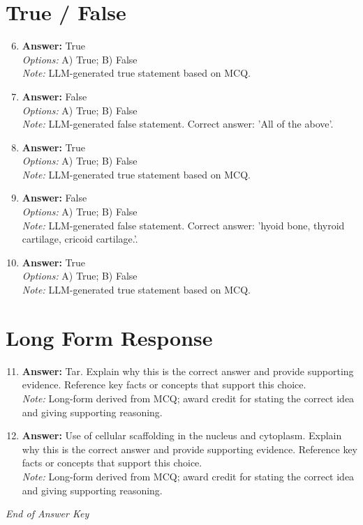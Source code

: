 \documentclass[12pt]{article}
\begin{document}
\section*{True / False}
\begin{enumerate}[label=\arabic*.]
\setcounter{enumi}{5}
\item \textbf{Answer:} True
\\ \textit{Options:} A) True; B) False
\\ \textit{Note:} LLM-generated true statement based on MCQ.
\item \textbf{Answer:} False
\\ \textit{Options:} A) True; B) False
\\ \textit{Note:} LLM-generated false statement. Correct answer: 'All of the above'.
\item \textbf{Answer:} True
\\ \textit{Options:} A) True; B) False
\\ \textit{Note:} LLM-generated true statement based on MCQ.
\item \textbf{Answer:} False
\\ \textit{Options:} A) True; B) False
\\ \textit{Note:} LLM-generated false statement. Correct answer: 'hyoid bone, thyroid cartilage, cricoid cartilage.'.
\item \textbf{Answer:} True
\\ \textit{Options:} A) True; B) False
\\ \textit{Note:} LLM-generated true statement based on MCQ.
\end{enumerate}

\section*{Long Form Response}
\begin{enumerate}[label=\arabic*.]
\setcounter{enumi}{10}
\item \textbf{Answer:} Tar. Explain why this is the correct answer and provide supporting evidence. Reference key facts or concepts that support this choice.
\\ \textit{Note:} Long-form derived from MCQ; award credit for stating the correct idea and giving supporting reasoning.
\item \textbf{Answer:} Use of cellular scaffolding in the nucleus and cytoplasm. Explain why this is the correct answer and provide supporting evidence. Reference key facts or concepts that support this choice.
\\ \textit{Note:} Long-form derived from MCQ; award credit for stating the correct idea and giving supporting reasoning.
\end{enumerate}

\vfill
\noindent\textit{End of Answer Key}
\end{document}
